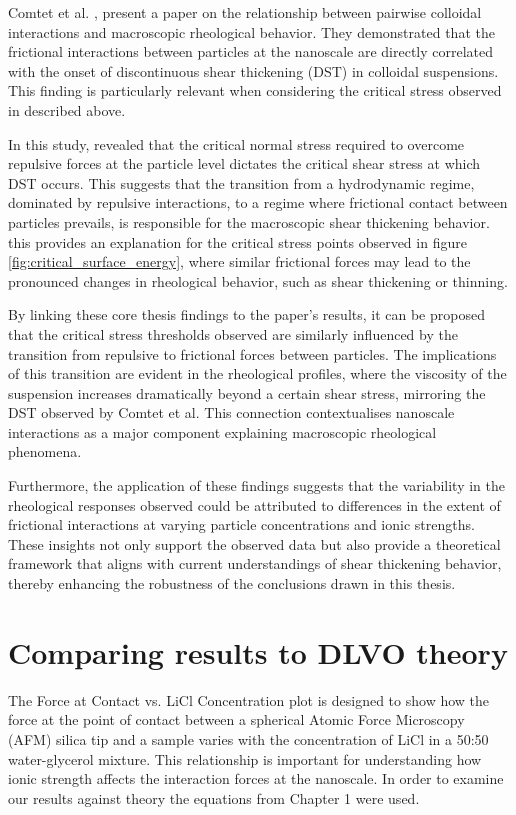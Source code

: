 Comtet et al. \cite{comtet2017pairwise}, present a paper on the relationship between pairwise colloidal interactions and macroscopic rheological behavior. They demonstrated that the frictional interactions between particles at the nanoscale are directly correlated with the onset of discontinuous shear thickening (DST) in colloidal suspensions. This finding is particularly relevant when considering the critical stress observed in described above.

In this study, revealed that the critical normal stress required to overcome repulsive forces at the particle level dictates the critical shear stress at which DST occurs. This suggests that the transition from a hydrodynamic regime, dominated by repulsive interactions, to a regime where frictional contact between particles prevails, is responsible for the macroscopic shear thickening behavior. this provides an explanation for the critical stress points observed in figure \ref{fig:critical_surface_energy}, where similar frictional forces may lead to the pronounced changes in rheological behavior, such as shear thickening or thinning.

By linking these core thesis findings to the paper's results, it can be proposed that the critical stress thresholds observed are similarly influenced by the transition from repulsive to frictional forces between particles. The implications of this transition are evident in the rheological profiles, where the viscosity of the suspension increases dramatically beyond a certain shear stress, mirroring the DST observed by Comtet et al. This connection contextualises nanoscale interactions as a major component explaining macroscopic rheological phenomena.

Furthermore, the application of these findings suggests that the variability in the rheological responses observed could be attributed to differences in the extent of frictional interactions at varying particle concentrations and ionic strengths. These insights not only support the observed data but also provide a theoretical framework that aligns with current understandings of shear thickening behavior, thereby enhancing the robustness of the conclusions drawn in this thesis.

\section{Comparing results to DLVO theory}

The Force at Contact vs. LiCl Concentration plot is designed to show how the force at the point of contact between a spherical Atomic Force Microscopy (AFM) silica tip and a sample varies with the concentration of LiCl in a 50:50 water-glycerol mixture. This relationship is important for understanding how ionic strength affects the interaction forces at the nanoscale. In order to examine our results against theory the equations from Chapter 1 were used.

